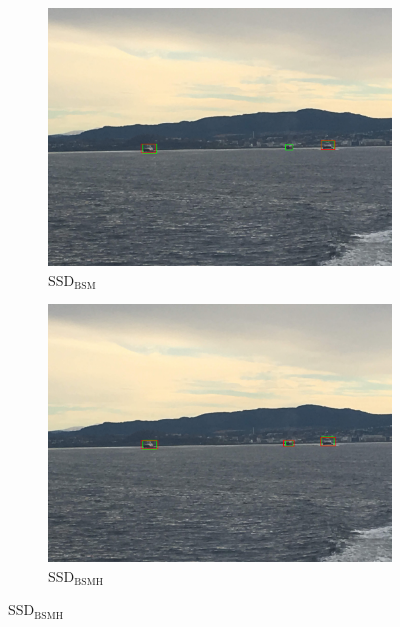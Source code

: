 \begin{figure}[h!]
\begin{subfigure}{.5\textwidth}
  \centering
  \includegraphics[width=0.8\linewidth]{results/case_buildings/ssdtrf/ssd2/3better/IMG_2216.jpg}
  \caption{SSD$_{\text{BSM}}$}
\end{subfigure}%
\begin{subfigure}{.5\textwidth}
  \centering
  \includegraphics[width=.8\linewidth]{results/case_buildings/ssdtrf/ssd3/3better/IMG_2216.jpg}
  \caption{SSD$_{\text{BSMH}}$}
\end{subfigure}


\end{figure}
